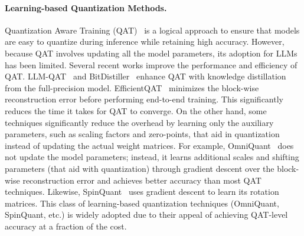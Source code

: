 \paragraph{Learning-based Quantization Methods.} Quantization Aware Training (QAT)~\citep{jacob2018quantization,abdolrashidi2021pareto} is a logical approach to ensure that models are easy to quantize during inference while retaining high accuracy. However, because QAT involves updating all the model parameters, its adoption for LLMs has been limited. Several recent works improve the performance and efficiency of QAT. LLM-QAT~\citep{DBLP:llmqat} and BitDistiller~\citep{DBLP:BitDistiller} enhance QAT with knowledge distillation from the full-precision model. EfficientQAT~\citep{DBLP:efficientqat} minimizes the block-wise reconstruction error before performing end-to-end training. This significantly reduces the time it takes for QAT to converge. On the other hand, some techniques significantly reduce the overhead by learning only the auxiliary parameters, such as scaling factors and zero-points, that aid in quantization instead of updating the actual weight matrices. For example, OmniQuant~\citep{shao2023omniquant} does not update the model parameters; instead, it learns additional scales and shifting parameters (that aid with quantization) through gradient descent over the block-wise reconstruction error and achieves better accuracy than most QAT techniques. Likewise, SpinQuant~\citep{spinquant} uses gradient descent to learn its rotation matrices. This class of learning-based quantization techniques (OmniQuant, SpinQuant, etc.) is widely adopted due to their appeal of achieving QAT-level accuracy at a fraction of the cost.

\vspace{-3mm}
